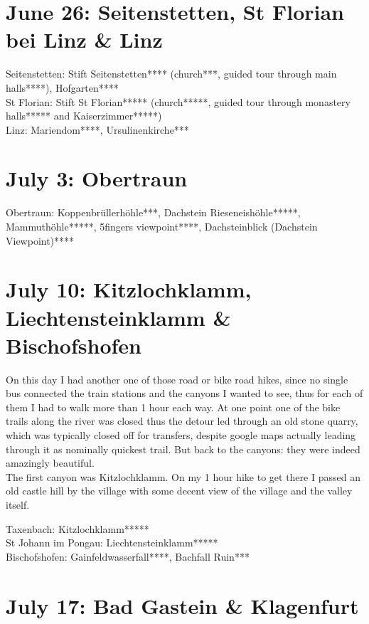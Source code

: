 {\section{June 26: Seitenstetten, St Florian bei Linz \& Linz}
\label{2021SeitenstettenStFlorian}

Seitenstetten: Stift Seitenstetten**** (church***, guided tour through main halls****), Hofgarten****\\
St Florian: Stift St Florian***** (church*****, guided tour through monastery halls***** and Kaiserzimmer*****)\\
Linz: Mariendom****, Ursulinenkirche***\\

\section{July 3: Obertraun}
\label{2021Obertraun}

Obertraun: Koppenbr\"ullerh\"ohle***, Dachstein Rieseneish\"ohle*****, Mammuth\"ohle*****, 5fingers viewpoint****, Dachsteinblick (Dachstein Viewpoint)****

\section{July 10: Kitzlochklamm, Liechtensteinklamm \& Bischofshofen}
\label{2021Pongau}

On this day I had another one of those road or bike road hikes, since no single bus connected the train stations and the canyons I wanted to see, thus for each of them I had to walk more than 1 hour each way. At one point one of the bike trails along the river was closed thus the detour led through an old stone quarry, which was typically closed off for transfers, despite google maps actually leading through it as nominally quickest trail. But back to the canyons: they were indeed amazingly beautiful.\\

The first canyon was Kitzlochklamm. On my 1 hour hike to get there I passed an old castle hill by the village with some decent view of the village and the valley itself.

Taxenbach: Kitzlochklamm*****\\
St Johann im Pongau: Liechtensteinklamm*****\\
Bischofshofen: Gainfeldwasserfall****, Bachfall Ruin***

\section{July 17: Bad Gastein \& Klagenfurt}
\label{2021GasteinKlagenfurt}

}
